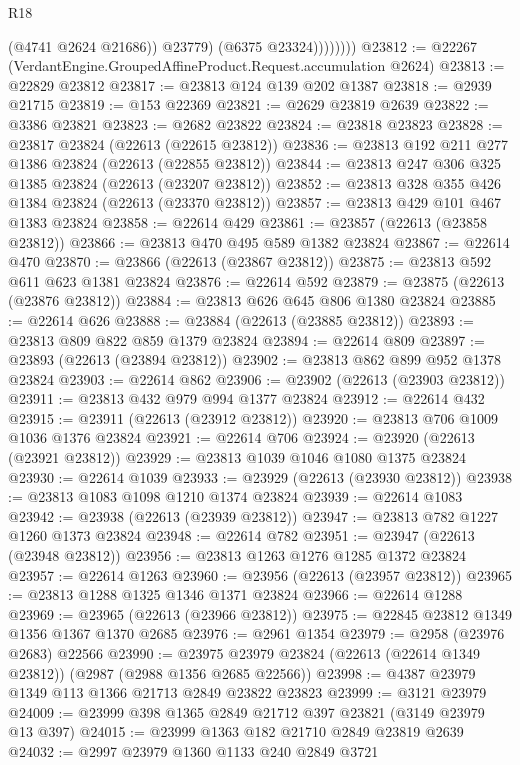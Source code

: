 \begin{lexlean}{R18}
\begin{coremodule}
                      (@4741 @2624 @21686))
                    @23779)
                  (@6375 @23324))))))))
@23812 := @22267 (VerdantEngine.GroupedAffineProduct.Request.accumulation @2624)
@23813 := @22829 @23812
@23817 := @23813 @124 @139 @202 @1387
@23818 := @2939 @21715
@23819 := @153 @22369
@23821 := @2629 @23819 @2639
@23822 := @3386 @23821
@23823 := @2682 @23822
@23824 := @23818 @23823
@23828 := @23817 @23824 (@22613 (@22615 @23812))
@23836 := @23813 @192 @211 @277 @1386 @23824 (@22613 (@22855 @23812))
@23844 := @23813 @247 @306 @325 @1385 @23824 (@22613 (@23207 @23812))
@23852 := @23813 @328 @355 @426 @1384 @23824 (@22613 (@23370 @23812))
@23857 := @23813 @429 @101 @467 @1383 @23824
@23858 := @22614 @429
@23861 := @23857 (@22613 (@23858 @23812))
@23866 := @23813 @470 @495 @589 @1382 @23824
@23867 := @22614 @470
@23870 := @23866 (@22613 (@23867 @23812))
@23875 := @23813 @592 @611 @623 @1381 @23824
@23876 := @22614 @592
@23879 := @23875 (@22613 (@23876 @23812))
@23884 := @23813 @626 @645 @806 @1380 @23824
@23885 := @22614 @626
@23888 := @23884 (@22613 (@23885 @23812))
@23893 := @23813 @809 @822 @859 @1379 @23824
@23894 := @22614 @809
@23897 := @23893 (@22613 (@23894 @23812))
@23902 := @23813 @862 @899 @952 @1378 @23824
@23903 := @22614 @862
@23906 := @23902 (@22613 (@23903 @23812))
@23911 := @23813 @432 @979 @994 @1377 @23824
@23912 := @22614 @432
@23915 := @23911 (@22613 (@23912 @23812))
@23920 := @23813 @706 @1009 @1036 @1376 @23824
@23921 := @22614 @706
@23924 := @23920 (@22613 (@23921 @23812))
@23929 := @23813 @1039 @1046 @1080 @1375 @23824
@23930 := @22614 @1039
@23933 := @23929 (@22613 (@23930 @23812))
@23938 := @23813 @1083 @1098 @1210 @1374 @23824
@23939 := @22614 @1083
@23942 := @23938 (@22613 (@23939 @23812))
@23947 := @23813 @782 @1227 @1260 @1373 @23824
@23948 := @22614 @782
@23951 := @23947 (@22613 (@23948 @23812))
@23956 := @23813 @1263 @1276 @1285 @1372 @23824
@23957 := @22614 @1263
@23960 := @23956 (@22613 (@23957 @23812))
@23965 := @23813 @1288 @1325 @1346 @1371 @23824
@23966 := @22614 @1288
@23969 := @23965 (@22613 (@23966 @23812))
@23975 := @22845 @23812 @1349 @1356 @1367 @1370 @2685
@23976 := @2961 @1354
@23979 := @2958 (@23976 @2683) @22566
@23990 := @23975 @23979 @23824 (@22613 (@22614 @1349 @23812)) (@2987 (@2988 @1356 @2685 @22566))
@23998 := @4387 @23979 @1349 @113 @1366 @21713 @2849 @23822 @23823
@23999 := @3121 @23979
@24009 := @23999 @398 @1365 @2849 @21712 @397 @23821 (@3149 @23979 @13 @397)
@24015 := @23999 @1363 @182 @21710 @2849 @23819 @2639
@24032 := @2997
    @23979
    @1360
    @1133
    @240
    @2849
    @3721

\end{coremodule}
\end{lexlean}
